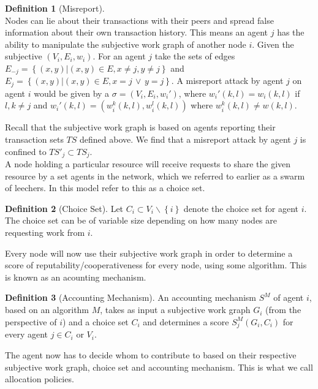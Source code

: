 \documentclass[11pt,a4paper]{report}
\theoremstyle{definition}
\newtheorem{definition}{Definition}[section]
\theoremstyle{theorem}
\theoremstyle{proposition}
\theoremstyle{corollary}
\theoremstyle{lemma}
\theoremstyle{example}
\theoremstyle{remark}
\begin{document}
\begin{definition}[Misreport]\ \\
Nodes can lie about their transactions with their peers and spread false information about their own transaction history. This means an agent $j$ has the ability to manipulate the subjective work graph of another node $i$. Given the subjective  $(V_i,E_i,w_i)$.  For an agent $j$ take the sets of edges $E_{-j}=\left\lbrace{}(x,y)|(x,y)\in{}E,x\neq{}j,y\neq{}j\right\rbrace$ and $E_{j}=\left\lbrace{}(x,y)|(x,y)\in{}E,x=j\,\vee\,y=j\right\rbrace$. A misreport attack by agent $j$ on agent $i$ would be given by a $\sigma=(V_i,E_i,w_i')$, where $w_i'(k,l) = w_i(k,l)$ if $l,k\neq{}j$ and $w_i'(k,l) = (w^k_i(k,l), w^l_i(k,l))$ where $w^k_i(k,l)\neq{}w(k,l).$ 
\end{definition}

\noindent{}Recall that the subjective work graph is based on agents reporting their transaction sets $TS$ defined above. We find that a misreport attack by agent $j$ is confined to $TS'_j\subset{}TS_j$. \vspace{1em}\\

\noindent{}A node holding a particular resource will receive requests to share the given resource by a set agents in the network, which we referred to earlier as a swarm of leechers. In this model \cite{} refer to this as a choice set.

\begin{definition}[Choice Set]
Let $C_i\subset{}V_i\backslash{}\left\lbrace{}i\right\rbrace$ denote the choice set for agent $i$. The choice set can be of variable size depending on how many nodes are requesting work from $i$. 
\end{definition}

\noindent{}Every node will now use their subjective work graph in order to determine a score of reputability/cooperativeness for every node, using some algorithm. This is known as an acounting mechanism.

\begin{definition}[Accounting Mechanism]
An accounting mechanism $S^M$ of agent $i$, based on an algorithm $M$, takes as input a subjective work graph $G_i$ (from the perspective of $i$) and a choice set $C_i$ and determines a score $S^M_j(G_i,C_i)$ for every agent $j\in{}C_i$ or $V_i$. 
\end{definition}

\noindent{}The agent now has to decide whom to contribute to based on their respective subjective work graph, choice set and accounting mechanism. This is what we call allocation policies. \vspace{1em}\\
\end{document}
